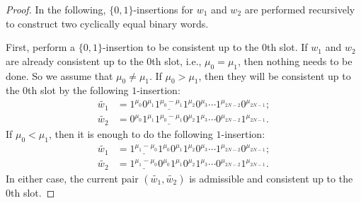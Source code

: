\documentclass{article}
\theoremstyle{definition}
\begin{document}
\begin{proof}
    In the following, $\{0,1\}$-insertions for $w_1$ and $w_2$ are performed recursively to construct two cyclically equal binary words. 

    First, perform a $\{0,1\}$-insertion to be consistent up to the 0th slot. If $w_1$ and $w_2$ are already consistent up to the 0th slot, i.e., $\mu_0 = \mu_1$, then nothing needs to be done. So we assume that $\mu_0 \neq \mu_1$. 
    If $\mu_0 > \mu_1$, then they will be consistent up to the 0th slot by the following $1$-insertion:
    \[
        \begin{split}
            \widetilde{w_1} &= 1^{\mu_0} 0^{\mu_1} \underline{1^{\mu_0-\mu_1}} 1^{\mu_2} 0^{\mu_3} \cdots 1^{\mu_{2N-2}} 0^{\mu_{2N-1}}; \\
            \widetilde{w_2} &= 0^{\mu_0} 1^{\mu_1} \underline{1^{\mu_0-\mu_1}} 0^{\mu_2} 1^{\mu_3} \cdots 0^{\mu_{2N-2}} 1^{\mu_{2N-1}}.
        \end{split}
    \]
    If $\mu_0 < \mu_1$, then it is enough to do the following $1$-insertion:
    \[
        \begin{split}
            \widetilde{w_1} &= \underline{1^{\mu_1-\mu_0}} 1^{\mu_0} 0^{\mu_1} 1^{\mu_2} 0^{\mu_3} \cdots 1^{\mu_{2N-2}} 0^{\mu_{2N-1}}; \\
            \widetilde{w_2} &= \underline{1^{\mu_1-\mu_0}} 0^{\mu_0} 1^{\mu_1} 0^{\mu_2} 1^{\mu_3} \cdots 0^{\mu_{2N-2}} 1^{\mu_{2N-1}}.
        \end{split}
    \]
    In either case, the current pair $(\widetilde{w_1}, \widetilde{w_2})$ is admissible and consistent up to the 0th slot.


\end{proof}
\end{document}
